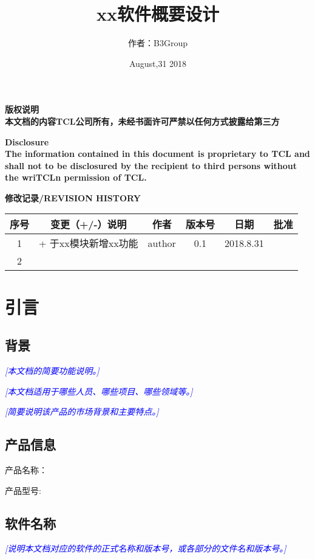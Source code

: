 \documentclass[UTF8]{ctexart}
\title{xx软件概要设计}
\author{作者：B3Group}
\date{August,31 2018}
\newcommand{\note}[1]{\textcolor{blue}{\emph{[#1]}}}   %
\newcommand{\pnote}[1]{\par{\textcolor{blue}{\emph{[#1]}}}}   %
\begin{document}
\maketitle
\thispagestyle{empty}
\newpage%
\setcounter{page}{1}
\begin{center}
 \vspace{20ex}
 \par{\textbf{版权说明\\本文档的内容TCL公司所有，未经书面许可严禁以任何方式披露给第三方}}
 \par{\textbf{Disclosure\\The information contained in this document is proprietary to TCL and shall
      not to be disclosured by the recipient to third persons without the wriTCLn permission of TCL.}}
 \vspace{2ex}
 \par{\textbf{修改记录/REVISION HISTORY}}
 \vspace{2ex}
 \par{}
 \begin{tabular}{|c|c|c|c|c|c|}
   \hline
    序号 & 变更（+/-）说明 & 作者 & 版本号 & 日期 & 批准 \\
    \hline
    1 & + 于xx模块新增xx功能 & author & 0.1 & 2018.8.31 &\\
    \hline
    2 & & & & &\\
    \hline
  \end{tabular}
\end{center}
 \newpage
 \tableofcontents%
 \newpage
 \section{引言} %
   \subsection{背景}
   \note{本文档的简要功能说明。}
   \pnote{本文档适用于哪些人员、哪些项目、哪些领域等。}
   \pnote{简要说明该产品的市场背景和主要特点。}
    \subsection{产品信息}产品名称：
     \par{产品型号:}
    \subsection{软件名称}
    \note{说明本文档对应的软件的正式名称和版本号，或各部分的文件名和版本号。}
\end{document}
